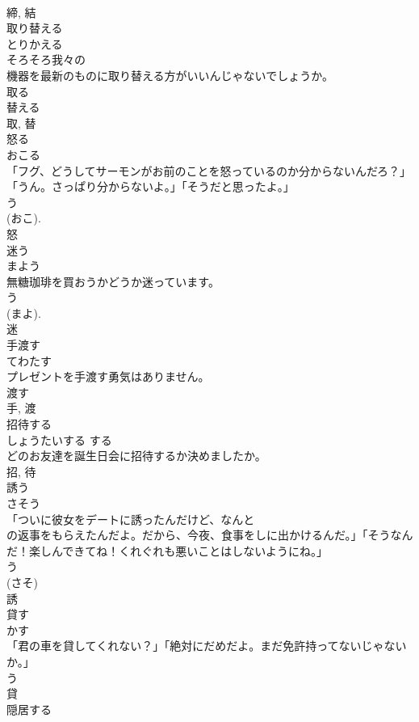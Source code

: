 \documentclass[8pt]{extreport}
\begin{document}
\begin{CJK}{UTF8}{min}
\\	締, 結	
\\	取り替える	
\\	とりかえる	
\\	そろそろ我々の
\\	機器を最新のものに取り替える方がいいんじゃないでしょうか。	
\\	取る 
\\	替える 
\\	取, 替	
\\	怒る	
\\	おこる	
\\	「フグ、どうしてサーモンがお前のことを怒っているのか分からないんだろ？」「うん。さっぱり分からないよ。」「そうだと思ったよ。」	
\\	う 
\\	(おこ). 
\\	怒	
\\	迷う	
\\	まよう	
\\	無糖珈琲を買おうかどうか迷っています。	
\\	う 
\\	(まよ). 
\\	迷	
\\	手渡す	
\\	てわたす	
\\	プレゼントを手渡す勇気はありません。	
\\	渡す 
\\	手, 渡	
\\	招待する	
\\	しょうたいする	する 
\\	どのお友達を誕生日会に招待するか決めましたか。	
\\	招, 待	
\\	誘う	
\\	さそう	
\\	「ついに彼女をデートに誘ったんだけど、なんと
\\	の返事をもらえたんだよ。だから、今夜、食事をしに出かけるんだ。」「そうなんだ！楽しんできてね！くれぐれも悪いことはしないようにね。」	
\\	う 
\\	(さそ) 
\\	誘	
\\	貸す	
\\	かす	
\\	「君の車を貸してくれない？」「絶対にだめだよ。まだ免許持ってないじゃないか。」	
\\	う 
\\	貸	
\\	隠居する	

\end{CJK}
\end{document}
